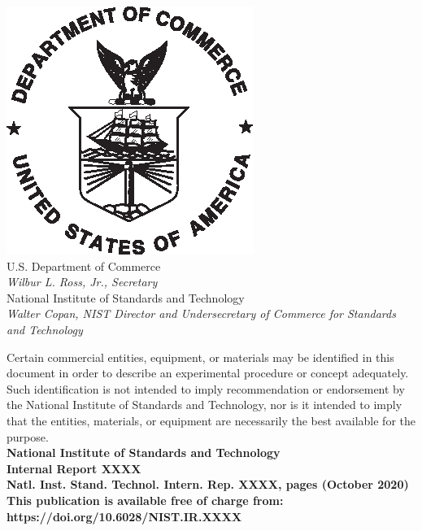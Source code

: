 \documentclass[12pt]{article}
\newcommand{\pubnumber}{XXXX}
\newcommand{\DOI}{https://doi.org/10.6028/NIST.IR.XXXX}
\newcommand{\monthyear}{October 2020}
\begin{document}
\begin{titlepage}
\begin{flushright}
\includegraphics[width=0.18\linewidth]{DoC-logo.eps}\\ 
 \vfill
\footnotesize U.S. Department of Commerce\\ 
\textit{Wilbur L. Ross, Jr., Secretary}\\
\vspace{10pt}
National Institute of Standards and Technology\\ 
\textit{Walter Copan, NIST Director and Undersecretary of Commerce for Standards and Technology}  
\end{flushright}
\end{titlepage}
\begin{titlepage}
\begin{flushright}
\footnotesize  Certain commercial entities, equipment, or materials may be identified
in this document in order to describe an experimental procedure or concept
adequately. Such identification is not intended to imply recommendation or
endorsement by the National Institute of Standards and Technology, nor is it intended
to imply that the entities, materials, or equipment are necessarily the best
available for the purpose.\\

\vfill
\normalsize \textbf{National Institute of Standards and Technology \\ Internal Report \pubnumber\\ 
Natl. Inst. Stand. Technol. Intern. Rep. \pubnumber, \pageref{LastPage} pages (\monthyear)} \\
\vspace{12pt}
\textbf{This publication is available free of charge from: \DOI}
\vfill
\end{flushright}
\end{titlepage}
\end{document}
